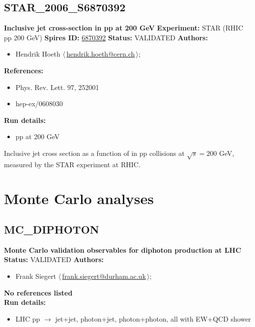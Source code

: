 \subsection[STAR\_2006\_S6870392]{STAR\_2006\_S6870392\,\cite{Abelev:2006uq}}
\textbf{Inclusive jet cross-section in pp at 200 GeV}\newline
\textbf{Experiment:} STAR (RHIC pp 200 GeV) \newline
\textbf{Spires ID:} \href{http://www.slac.stanford.edu/spires/find/hep/www?rawcmd=key+6870392}{6870392}\newline
\textbf{Status:} VALIDATED\newline
\textbf{Authors:}
\begin{itemize}
  \item Hendrik Hoeth $\langle\,$\href{mailto:hendrik.hoeth@cern.ch}{hendrik.hoeth@cern.ch}$\,\rangle$;
\end{itemize}
\textbf{References:}
\begin{itemize}
  \item Phys. Rev. Lett. 97, 252001
  \item hep-ex/0608030
\end{itemize}
\textbf{Run details:}
\begin{itemize}

  \item pp at 200 GeV\end{itemize}

\noindent Inclusive jet cross section as a function of \pT in pp collisions  at $\sqrt{s} = 200$ GeV, measured by the STAR experiment at RHIC.

\clearpage


\section{Monte Carlo analyses}
\subsection{MC\_DIPHOTON}
\textbf{Monte Carlo validation observables for diphoton production at LHC}\newline
\textbf{Status:} VALIDATED\newline
\textbf{Authors:}
\begin{itemize}
  \item Frank Siegert $\langle\,$\href{mailto:frank.siegert@durham.ac.uk}{frank.siegert@durham.ac.uk}$\,\rangle$;
\end{itemize}
\textbf{No references listed}\\ 
\textbf{Run details:}
\begin{itemize}

  \item LHC pp \ensuremath{\to} jet+jet, photon+jet, photon+photon, all with EW+QCD shower\end{itemize}

